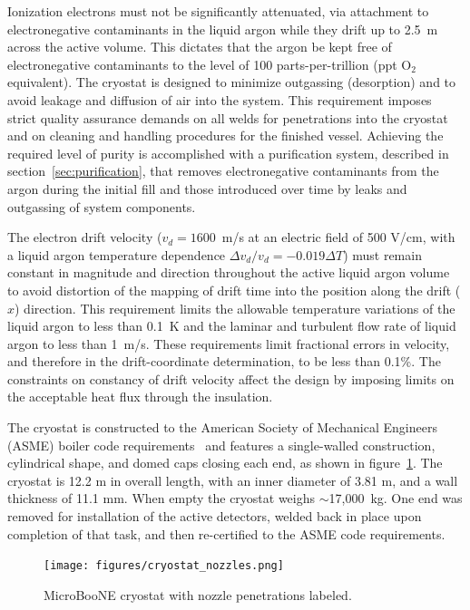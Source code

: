 Ionization electrons must not be significantly attenuated, via attachment to electronegative contaminants in the liquid argon while they drift up to 2.5~m across the active volume. This dictates that the argon be kept free of electronegative contaminants to the level of 100 parts-per-trillion (ppt O$_2$ equivalent). The cryostat is designed to minimize outgassing (desorption) and to avoid leakage and diffusion of air into the system. This requirement imposes strict quality assurance demands on all welds for penetrations into the cryostat and on cleaning and handling procedures for the finished vessel.  Achieving the required level of purity is accomplished with a purification system, described in section~\ref{sec:purification}, that removes electronegative contaminants from the argon during the initial fill and those introduced over time by leaks and outgassing of system components.

The electron drift velocity ($v_{d} = 1600$~m/s at an electric field of 500 V/cm, with a liquid argon temperature dependence $\Delta v_{d}/v_{d} = -0.019\Delta T$) must remain constant in magnitude and direction throughout the active liquid argon volume to avoid distortion of the mapping of drift time into the position along the drift ($\hat{x}$) direction. This requirement limits the allowable temperature variations of the liquid argon to less than 0.1~K and the laminar and turbulent flow rate of liquid argon to less than 1~m/s. These requirements limit fractional errors in velocity, and therefore in the drift-coordinate determination, to be less than 0.1\%. The constraints on constancy of drift velocity affect the design by imposing limits on the acceptable heat flux through the insulation.

The cryostat is constructed to the American Society of Mechanical Engineers (ASME) boiler code requirements~\cite{pressure:1316452} and features a single-walled construction, cylindrical shape, and domed caps closing each end, as shown in figure~\ref{fig:cryostat-drawing}. The cryostat is 12.2 m in overall length, with an inner diameter of 3.81 m, and a wall thickness of 11.1 mm.  When empty the cryostat weighs $\sim$17,000~kg.  One end was removed for installation of the active detectors, welded back in place upon completion of that task, and then re-certified to the ASME code requirements.  

\begin{figure}[htb]
\centering	
\texttt{[image: figures/cryostat\_nozzles.png]}
\caption{MicroBooNE cryostat with nozzle penetrations labeled.}
\label{fig:cryostat-drawing}
\end{figure}

